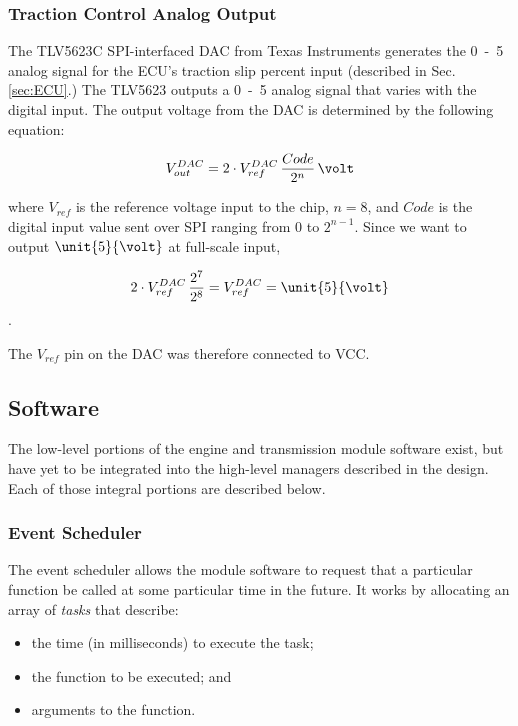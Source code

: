 \subsubsection{Traction Control Analog Output}

The TLV5623C SPI-interfaced DAC from Texas Instruments generates the \unit{0-5}{\volt} analog signal for the ECU's traction slip percent input (described in Sec. \ref{sec:ECU}.) The TLV5623 outputs a \unit{0-5}{\volt} analog signal that varies with the digital input. The output voltage from the DAC is determined by the following equation: \cite{TLV5623}

\begin{equation}
V_{out}^{DAC}=2\cdot{V_{ref}^{DAC}}\,\frac{Code}{2^{n}}\,\volt
\end{equation}

where $V_{ref}$ is the reference voltage input to the chip, $n=8$, and $Code$ is the digital input value sent over SPI ranging from $0$ to $2^{n-1}$. Since we want to output $\unit{5}{\volt}$ at full-scale input,

\begin{equation}
2\cdot{V_{ref}^{DAC}}\,\frac{2^{7}}{2^{8}}=V_{ref}^{DAC}=\unit{5}{\volt}
\end{equation}.

The $V_{ref}$ pin on the DAC was therefore connected to VCC.

\subsection{Software}

The low-level portions of the engine and transmission module software exist, but have yet to be integrated into the high-level managers described in the design. Each of those integral portions are described below.

\subsubsection{Event Scheduler}

The event scheduler allows the module software to request that a particular function be called at some particular time in the future. It works by allocating an array of \emph{tasks} that describe:

\begin{itemize}
	\item the time (in milliseconds) to execute the task;
	\item the function to be executed; and
	\item arguments to the function.
\end{itemize}

